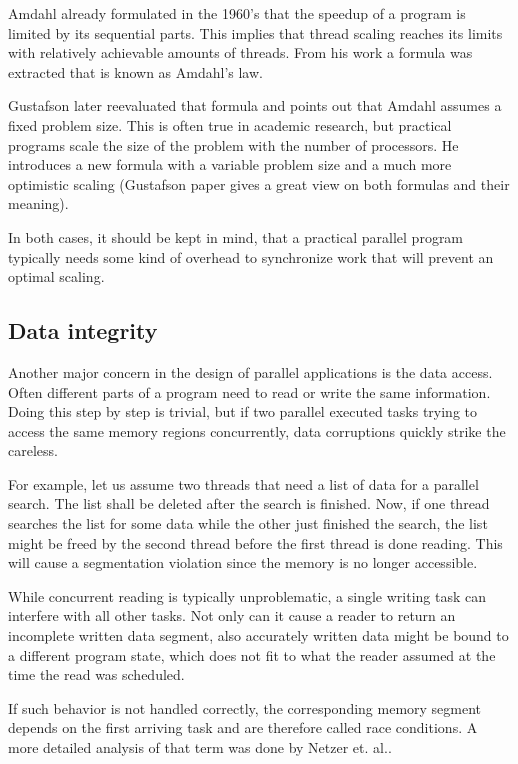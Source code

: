 Amdahl already formulated in the 1960's that the speedup of a program is limited by its sequential parts\cite{amdahl1967validity}. This implies that thread scaling reaches its limits with relatively achievable amounts of threads. From his work a formula was extracted that is known as Amdahl's law. 

Gustafson later reevaluated that formula\cite{gustafson1988reevaluating} and points out that Amdahl assumes a fixed problem size. This is often true in academic research, but practical programs scale the size of the problem with the number of processors. He introduces a new formula with a variable problem size and a much more optimistic scaling (Gustafson paper gives a great view on both formulas and their meaning).

In both cases, it should be kept in mind, that a practical parallel program typically needs some kind of overhead to synchronize work that will prevent an optimal scaling. 

\subsection{Data integrity}
Another major concern in the design of parallel applications is the data access. Often different parts of a program need to read or write the same information. Doing this step by step is trivial, but if two parallel executed tasks trying to access the same memory regions concurrently, data corruptions quickly strike the careless. 

For example, let us assume two threads that need a list of data for a parallel search. The list shall be deleted after the search is finished. Now, if one thread searches the list for some data while the other just finished the search, the list might be freed by the second thread before the first thread is done reading. This will cause a segmentation violation since the memory is no longer accessible.

While concurrent reading is typically unproblematic, a single writing task can interfere with all other tasks. Not only can it cause a reader to return an incomplete written data segment, also accurately written data might be bound to a different program state, which does not fit to what the reader assumed at the time the read was scheduled.

If such behavior is not handled correctly, the corresponding memory segment depends on the first arriving task and are therefore called race conditions. A more detailed analysis of that term was done by Netzer et. al.\cite{netzer1992race}.

